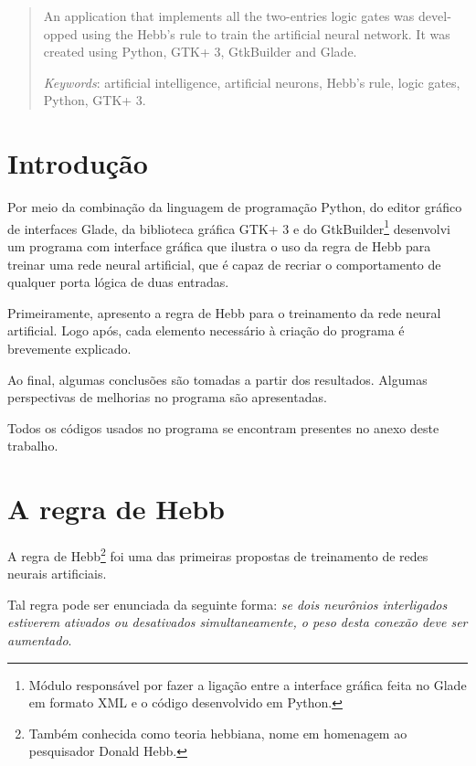 \documentclass[11pt]{article}
\begin{document}
\begin{otherlanguage}{english}
\begin{abstract}
An application that implements all the two-entries logic gates was developped using the Hebb's rule to train the artificial neural network.
It was created using Python, GTK+ 3, GtkBuilder and Glade. 

\emph{Keywords}: artificial intelligence, artificial neurons, Hebb's rule, logic gates, Python, GTK+ 3.
\end{abstract}
\end{otherlanguage}

\newpage
\tableofcontents
\newpage

\section{Introdução}

Por meio da combinação da linguagem de programação Python, do editor gráfico de interfaces Glade, da biblioteca gráfica GTK+ 3 e do GtkBuilder\footnote{Módulo responsável por fazer a ligação entre a interface gráfica feita no Glade em formato XML e o código desenvolvido em Python.} desenvolvi um programa com interface gráfica que ilustra o uso da regra de Hebb para treinar uma rede neural artificial, que é capaz de recriar o comportamento de qualquer porta lógica de duas entradas.

Primeiramente, apresento a regra de Hebb para o treinamento da rede neural artificial. Logo após, cada elemento necessário à criação do programa é brevemente explicado.

Ao final, algumas conclusões são tomadas a partir dos resultados. Algumas perspectivas de melhorias no programa são apresentadas.

Todos os códigos usados no programa se encontram presentes no anexo deste trabalho.    

\section{A regra de Hebb}

A regra de Hebb\footnote{Também conhecida como teoria hebbiana, nome em homenagem ao pesquisador Donald Hebb.} foi uma das primeiras propostas de treinamento de redes neurais artificiais.

Tal regra pode ser enunciada da seguinte forma: \emph{se dois neurônios interligados estiverem ativados ou desativados simultaneamente, o peso desta conexão deve ser aumentado}.
\end{document}
